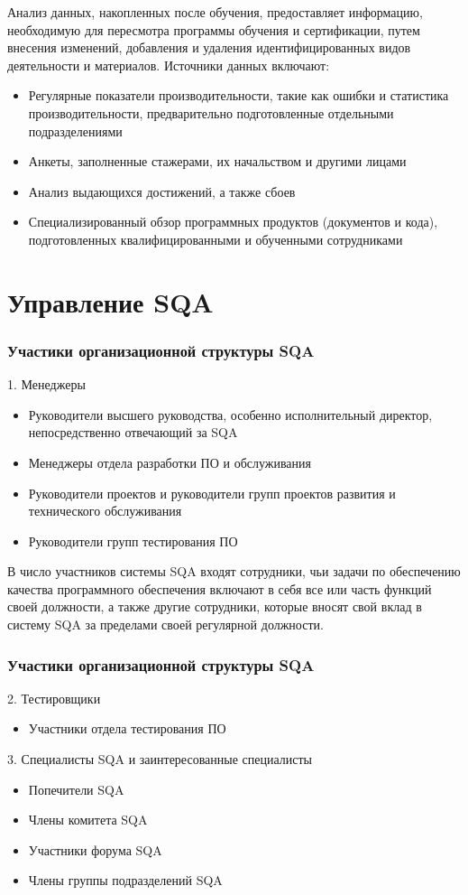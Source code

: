 \documentclass{../industrial-development}
\begin{document}
\lecturenotes

Анализ данных, накопленных после обучения, предоставляет информацию, необходимую для пересмотра программы обучения и сертификации, путем внесения изменений, добавления и удаления идентифицированных видов деятельности и материалов. Источники данных включают:
 	 \begin{itemize}
\item Регулярные показатели производительности, такие как ошибки и статистика производительности, предварительно подготовленные отдельными подразделениями
\item Анкеты, заполненные стажерами, их начальством и другими лицами
\item Анализ выдающихся достижений, а также сбоев
\item Специализированный обзор программных продуктов (документов и кода), подготовленных квалифицированными и обученными сотрудниками~\cite[с.~344]{SQA-Galin}
  	\end{itemize}



\section{Управление SQA}
\begin{frame} \frametitle{Участики организационной структуры SQA}
 	1. Менеджеры
	\begin{itemize}
\item Руководители высшего руководства, особенно исполнительный директор, непосредственно отвечающий за SQA
\item Менеджеры отдела разработки ПО и обслуживания
\item Руководители проектов и руководители групп проектов развития и технического обслуживания
\item Руководители групп тестирования ПО
  	\end{itemize}
\end{frame}

\lecturenotes

В число участников системы SQA входят сотрудники, чьи задачи по обеспечению качества программного обеспечения включают в себя все или часть функций своей должности, а также другие сотрудники, которые вносят свой вклад в систему SQA за пределами своей регулярной должности.

\begin{frame} \frametitle{Участики организационной структуры SQA}
	2. Тестировщики
	\begin{itemize}
\item Участники отдела тестирования ПО
  	\end{itemize}
	3. Специалисты SQA и заинтересованные специалисты
	\begin{itemize}
\item Попечители SQA
\item Члены комитета SQA
\item Участники форума SQA
\item Члены группы подразделений SQA
  	\end{itemize}
\end{frame}
\end{document}
